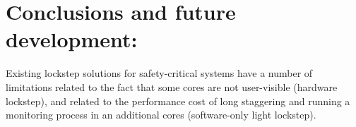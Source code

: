 \documentclass[a4paper,12pt]{article}
\begin{document}




%
%
%
%
%






%


\clearpage
\section{Conclusions and future development: }


Existing lockstep solutions for safety-critical systems have a number of limitations related to the fact that some cores are not user-visible (hardware lockstep), and related to the performance cost of long staggering and running a monitoring process in an additional cores (software-only light lockstep). 
\end{document}
